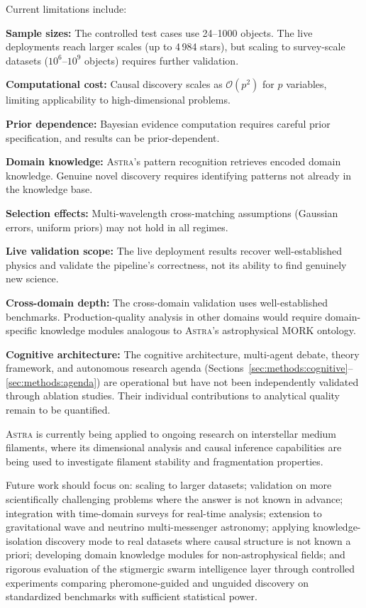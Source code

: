 \documentclass[usenatbib]{rasti}
\newcommand{\astra}{\textsc{Astra}\xspace}
\begin{document}
Current limitations include:
\begin{description}
  \item \textbf{Sample sizes:} The controlled test cases use 24--1000 objects. The live deployments reach larger scales (up to 4\,984 stars), but scaling to survey-scale datasets ($10^{6}$--$10^{9}$ objects) requires further validation.
  \item \textbf{Computational cost:} Causal discovery scales as $\mathcal{O}(p^2)$ for $p$ variables, limiting applicability to high-dimensional problems.
  \item \textbf{Prior dependence:} Bayesian evidence computation requires careful prior specification, and results can be prior-dependent.
  \item \textbf{Domain knowledge:} \astra's pattern recognition retrieves encoded domain knowledge. Genuine novel discovery requires identifying patterns not already in the knowledge base.
  \item \textbf{Selection effects:} Multi-wavelength cross-matching assumptions (Gaussian errors, uniform priors) may not hold in all regimes.
  \item \textbf{Live validation scope:} The live deployment results recover well-established physics and validate the pipeline's correctness, not its ability to find genuinely new science.
  \item \textbf{Cross-domain depth:} The cross-domain validation uses well-established benchmarks. Production-quality analysis in other domains would require domain-specific knowledge modules analogous to \astra's astrophysical MORK ontology.
  \item \textbf{Cognitive architecture:} The cognitive architecture, multi-agent debate, theory framework, and autonomous research agenda (Sections~\ref{sec:methods:cognitive}--\ref{sec:methods:agenda}) are operational but have not been independently validated through ablation studies. Their individual contributions to analytical quality remain to be quantified.
\end{description}

\astra is currently being applied to ongoing research on interstellar medium filaments, where its dimensional analysis and causal inference capabilities are being used to investigate filament stability and fragmentation properties.

Future work should focus on: scaling to larger datasets; validation on more scientifically challenging problems where the answer is not known in advance; integration with time-domain surveys for real-time analysis; extension to gravitational wave and neutrino multi-messenger astronomy; applying knowledge-isolation discovery mode to real datasets where causal structure is not known a priori; developing domain knowledge modules for non-astrophysical fields; and rigorous evaluation of the stigmergic swarm intelligence layer through controlled experiments comparing pheromone-guided and unguided discovery on standardized benchmarks with sufficient statistical power.
\end{document}

